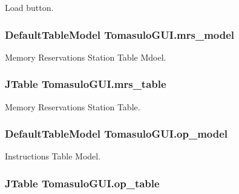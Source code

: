 \-Load button. 

\hypertarget{classTomasuloGUI_ad017a1554cee627c47c5cea70fc58908}{
\subsubsection[{mrs\-\_\-model}]{\setlength{\rightskip}{0pt plus 5cm}\-Default\-Table\-Model {\bf \-Tomasulo\-G\-U\-I.\-mrs\-\_\-model}}}\label{classTomasuloGUI_ad017a1554cee627c47c5cea70fc58908}


\-Memory \-Reservations \-Station \-Table \-Mdoel. 

\hypertarget{classTomasuloGUI_a18580aaadebeefbfc8a2a6a6896d5a10}{
\subsubsection[{mrs\-\_\-table}]{\setlength{\rightskip}{0pt plus 5cm}\-J\-Table {\bf \-Tomasulo\-G\-U\-I.\-mrs\-\_\-table}}}\label{classTomasuloGUI_a18580aaadebeefbfc8a2a6a6896d5a10}


\-Memory \-Reservations \-Station \-Table. 

\hypertarget{classTomasuloGUI_a6b5d956697d14589539bb8f765c8da5c}{
\subsubsection[{op\-\_\-model}]{\setlength{\rightskip}{0pt plus 5cm}\-Default\-Table\-Model {\bf \-Tomasulo\-G\-U\-I.\-op\-\_\-model}}}\label{classTomasuloGUI_a6b5d956697d14589539bb8f765c8da5c}


\-Instructions \-Table \-Model. 

\hypertarget{classTomasuloGUI_a99dac43adb85dce62618469b155021f8}{
\subsubsection[{op\-\_\-table}]{\setlength{\rightskip}{0pt plus 5cm}\-J\-Table {\bf \-Tomasulo\-G\-U\-I.\-op\-\_\-table}}}\label{classTomasuloGUI_a99dac43adb85dce62618469b155021f8}


